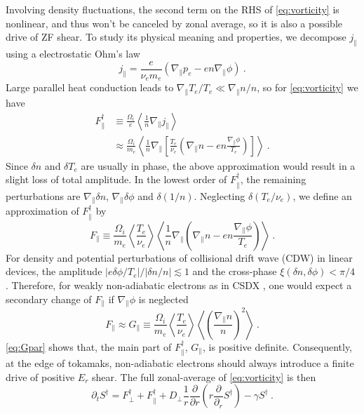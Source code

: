 \documentclass[aps,pre,twocolumn,superscriptaddress]{revtex4-2}
\begin{document}
Involving density fluctuations, the second term on the RHS of \cref{eq:vorticity} is nonlinear, and thus won't be canceled by zonal average, so it is also a possible drive of ZF shear. To study its physical meaning and properties, we decompose $j_{\parallel}$ using a electrostatic Ohm's law \cite{Zeiler_1997,Lang_2019}
\begin{equation}
j_{\parallel}=\frac{e}{\nu_{e}m_{e}}\left(\nabla_{\parallel}p_{e}-en\nabla_{\parallel}\phi\right)~.
\label{eq:Ohm}
\end{equation}
Large parallel heat conduction leads to $\nabla_{\parallel}T_{e}/T_{e}\ll\nabla_{\parallel}n/n$, so for \cref{eq:vorticity} we have
\begin{equation}
\begin{aligned}
	F_{\parallel}^{\dagger}
	&\equiv\frac{\Omega_{i}}{e}\left<\frac{1}{n}
	\nabla_{\parallel}j_{\parallel}\right> \\
	&\approx\frac{\Omega_{i}}{m_{e}}\left<\frac{1}{n}\nabla_{\parallel}
	\left[\frac{T_{e}}{\nu_{e}}\left(\nabla_{\parallel}n-en\frac{\nabla_{\parallel}
	\phi}{T_{e}}\right)\right]\right>~.
\label{eq:Fpar_dagger}
\end{aligned}
\end{equation}
Since $\delta n$ and $\delta T_{e}$ are usually in phase, the above approximation would result in a slight loss of total amplitude. In the lowest order of $F_{\parallel}^{\dagger}$, the remaining perturbations are $\nabla_{\parallel}\delta n$, $\nabla_{\parallel}\delta\phi$ and $\delta\left(1/n\right)$. Neglecting $\delta\left(T_{e}/\nu_{e}\right)$, we define an approximation of $F_{\parallel}^{\dagger}$ by
\begin{equation}
	F_{\parallel}\equiv\frac{\Omega_{i}}{m_{e}}\left<\frac{T_{e}}{\nu_{e}}\right>
	\left<\frac{1}{n}\nabla_{\parallel}
	\left(\nabla_{\parallel}n-en\frac{\nabla_{\parallel}
	\phi}{T_{e}}\right)\right>~.
\label{eq:Fpar}
\end{equation}
For density and potential perturbations of collisional drift wave (CDW) in linear devices, the amplitude $\left|e\delta\phi/T_{e}\right|/\left|\delta n/n\right|\apprle 1$ and the cross-phase $\xi\left(\delta n,\delta\phi\right)<\pi/4$ \cite{Thakur_2014,Jassby_1972}. Therefore, for weakly non-adiabatic electrons as in CSDX \cite{Hong_2018G,Hong_2018T}, one would expect a secondary change of $F_{\parallel}$ if $\nabla_{\parallel}\phi$ is neglected
\begin{equation}
	F_{\parallel}\approx G_{\parallel}
	\equiv \frac{\Omega_{i}}{m_{e}}\left<\frac{T_{e}}{\nu_{e}}\right>
	\left<\left(\frac{\nabla_{\parallel}n}{n}\right)^{2}\right>~.
\label{eq:Gpar}
\end{equation}
\cref{eq:Gpar} shows that, the main part of $F_{\parallel}^{\dagger}$, $G_{\parallel}$, is positive definite. Consequently, at the edge of tokamaks, non-adiabatic electrons should always introduce a finite drive of positive $E_{r}$ shear.
The full zonal-average of \cref{eq:vorticity} is then
\begin{equation}
	\partial_t S^{\dagger}=F_{\perp}^{\dagger}+F_{\parallel}^{\dagger}+
	D_{\perp}\frac{1}{r}\frac{\partial}{\partial r}
	\left(r\frac{\partial}{\partial_{r}}S^{\dagger}\right)-
	\gamma S^{\dagger}~.
\end{equation}
\end{document}
